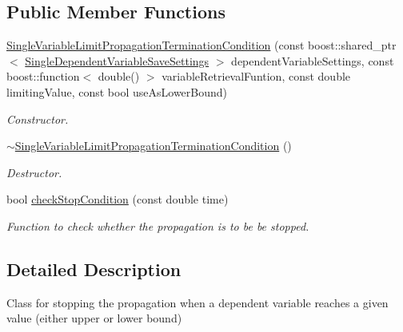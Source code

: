 \subsection*{Public Member Functions}
\begin{DoxyCompactItemize}
\item 
\hyperlink{classtudat_1_1propagators_1_1SingleVariableLimitPropagationTerminationCondition_a58d360d685f4986c0d83597ed8159755}{Single\+Variable\+Limit\+Propagation\+Termination\+Condition} (const boost\+::shared\+\_\+ptr$<$ \hyperlink{classtudat_1_1propagators_1_1SingleDependentVariableSaveSettings}{Single\+Dependent\+Variable\+Save\+Settings} $>$ dependent\+Variable\+Settings, const boost\+::function$<$ double() $>$ variable\+Retrieval\+Funtion, const double limiting\+Value, const bool use\+As\+Lower\+Bound)
\begin{DoxyCompactList}\small\item\em Constructor. \end{DoxyCompactList}\item 
\hyperlink{classtudat_1_1propagators_1_1SingleVariableLimitPropagationTerminationCondition_a4210729b9226d3aaaff9a53ba3568771}{$\sim$\+Single\+Variable\+Limit\+Propagation\+Termination\+Condition} ()\hypertarget{classtudat_1_1propagators_1_1SingleVariableLimitPropagationTerminationCondition_a4210729b9226d3aaaff9a53ba3568771}{}\label{classtudat_1_1propagators_1_1SingleVariableLimitPropagationTerminationCondition_a4210729b9226d3aaaff9a53ba3568771}

\begin{DoxyCompactList}\small\item\em Destructor. \end{DoxyCompactList}\item 
bool \hyperlink{classtudat_1_1propagators_1_1SingleVariableLimitPropagationTerminationCondition_ab2a682cf569c1f1d0b3ccc79a26fca32}{check\+Stop\+Condition} (const double time)
\begin{DoxyCompactList}\small\item\em Function to check whether the propagation is to be be stopped. \end{DoxyCompactList}\end{DoxyCompactItemize}


\subsection{Detailed Description}
Class for stopping the propagation when a dependent variable reaches a given value (either upper or lower bound) 

